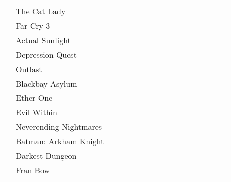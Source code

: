 \documentclass[twoside]{tfg-urjc}
\begin{document}
\begin{landscape}
\begin{longtable}{l  l  *{15}{c} }
                      & The Cat Lady	      	     &      &      &        &       &                      &                   &                   &                   &                   \\
                      & Far Cry 3	      	     &      &      &        &       &                      &                   &                   &                   &                   \\
                      & Actual Sunlight	             &      &      &        &       &                      &                   &                   &                   &                   \\
                      & Depression Quest	     &      &      &        &       &                      &                   &                   &                   &                   \\
                      & Outlast			     &      &      &        &       &                      &                   &                   &                   &                   \\
                      & Blackbay Asylum		     &      &      &        &       &                      &                   &                   &                   &                   \\
                      & Ether One		     &      &      &        &       &                      &                   &                   &                   &                   \\
                      & Evil Within		     &      &      &        &       &                      &                   &                   &                   &                   \\
                      & Neverending Nightmares	     &      &      &        &       &                      &                   &                   &                   &                   \\
                      & Batman: Arkham Knight	     &      &      &        &       &                      &                   &                   &                   &                   \\
                      & Darkest Dungeon		     &      &      &        &       &                      &                   &                   &                   &                   \\
                      & Fran Bow		     &      &      &        &       &                      &                   &                   &                   &                   \\

\end{longtable}
\end{landscape}
\end{document}
